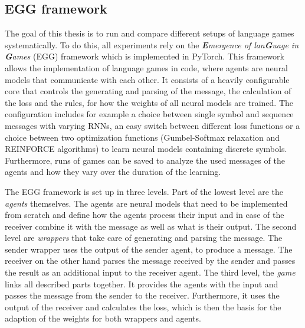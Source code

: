 \subsection{EGG framework}
The goal of this thesis is to run and compare different setups of language games systematically.
To do this, all experiments rely on the \emph{\textbf{E}mergence of lan\textbf{G}uage in \textbf{G}ames} (EGG) framework \citep{Kharitonov2019} which is implemented in PyTorch.
This framework allows the implementation of language games in code, where agents are neural models that communicate with each other.
It consists of a heavily configurable core that controls the generating and parsing of the message, the calculation of the loss and the rules, for how the weights of all neural models are trained.
The configuration includes for example a choice between single symbol and sequence messages with varying RNNs, an easy switch between different loss functions or a choice between two optimization functions (Gumbel-Softmax relaxation and REINFORCE algorithms) to learn neural models containing discrete symbols.
Furthermore, runs of games can be saved to analyze the used messages of the agents and how they vary over the duration of the learning.

The EGG framework is set up in three levels.
Part of the lowest level are the \emph{agents} themselves.
The agents are neural models that need to be implemented from scratch and define how the agents process their input and in case of the receiver combine it with the message as well as what is their output.
The second level are \emph{wrappers} that take care of generating and parsing the message.
The sender wrapper uses the output of the sender agent, to produce a message.
The receiver on the other hand parses the message received by the sender and passes the result as an additional input to the receiver agent.
The third level, the \emph{game} links all described parts together.
It provides the agents with the input and passes the message from the sender to the receiver.
Furthermore, it uses the output of the receiver and calculates the loss, which is then the basis for the adaption of the weights for both wrappers and agents.

